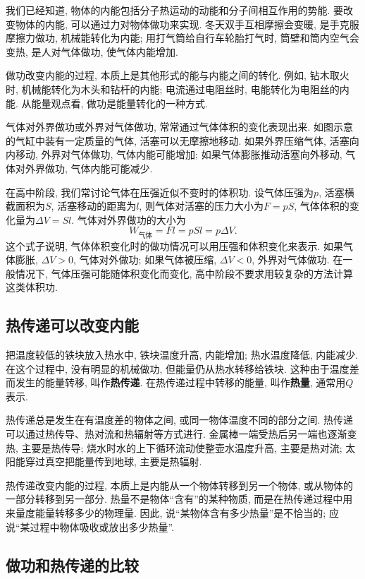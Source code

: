 \documentclass[11pt,a4paper]{ctexbook}
\begin{document}
我们已经知道, 物体的内能包括分子热运动的动能和分子间相互作用的势能. 要改变物体的内能,
可以通过力对物体做功来实现. 冬天双手互相摩擦会变暖, 是手克服摩擦力做功, 机械能转化为内能;
用打气筒给自行车轮胎打气时, 筒壁和筒内空气会变热, 是人对气体做功, 使气体内能增加.

做功改变内能的过程, 本质上是其他形式的能与内能之间的转化. 例如, 钻木取火时,
机械能转化为木头和钻杆的内能; 电流通过电阻丝时, 电能转化为电阻丝的内能. 从能量观点看,
做功是能量转化的一种方式.

气体对外界做功或外界对气体做功, 常常通过气体体积的变化表现出来. 如图示意的气缸中装有一定质量的气体,
活塞可以无摩擦地移动. 如果外界压缩气体, 活塞向内移动, 外界对气体做功, 气体内能可能增加;
如果气体膨胀推动活塞向外移动, 气体对外界做功, 气体内能可能减少.

在高中阶段, 我们常讨论气体在压强近似不变时的体积功. 设气体压强为$p$, 活塞横截面积为$S$,
活塞移动的距离为$l$, 则气体对活塞的压力大小为$F=pS$, 气体体积的变化量为$\Delta V=Sl$.
气体对外界做功的大小为
$$W_\text{气体}=Fl=pS l=p\Delta V.$$
这个式子说明, 气体体积变化时的做功情况可以用压强和体积变化来表示. 如果气体膨胀,
$\Delta V>0$, 气体对外做功; 如果气体被压缩, $\Delta V<0$, 外界对气体做功.
在一般情况下, 气体压强可能随体积变化而变化, 高中阶段不要求用较复杂的方法计算这类体积功.

\subsection{热传递可以改变内能}

把温度较低的铁块放入热水中, 铁块温度升高, 内能增加; 热水温度降低, 内能减少.
在这个过程中, 没有明显的机械做功, 但能量仍从热水转移给铁块. 这种由于温度差而发生的能量转移,
叫作\textbf{热传递}. 在热传递过程中转移的能量, 叫作\textbf{热量}, 通常用$Q$表示.

热传递总是发生在有温度差的物体之间, 或同一物体温度不同的部分之间. 热传递可以通过热传导、热对流和热辐射等方式进行.
金属棒一端受热后另一端也逐渐变热, 主要是热传导; 烧水时水的上下循环流动使整壶水温度升高, 主要是热对流;
太阳能穿过真空把能量传到地球, 主要是热辐射.

热传递改变内能的过程, 本质上是内能从一个物体转移到另一个物体, 或从物体的一部分转移到另一部分.
热量不是物体``含有''的某种物质, 而是在热传递过程中用来量度能量转移多少的物理量.
因此, 说``某物体含有多少热量''是不恰当的; 应说``某过程中物体吸收或放出多少热量''.

\subsection{做功和热传递的比较}
\end{document}
